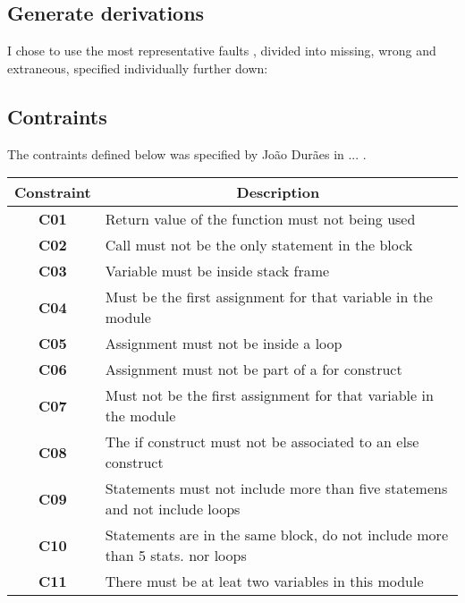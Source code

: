 \subsection{Generate derivations}

I chose to use the most representative faults \cite{duraes2006emulation}, divided into missing, wrong and extraneous, specified individually further down:

\subsection{Contraints}

The contraints defined below was specified by João Durães in ... .

\begin{table}[h]
\begin{tabular}{|c|l|}
\hline
\textbf{Constraint} & \multicolumn{1}{c|}{\textbf{Description}}                                     \\ \hline
\textbf{C01}       \label{C01}  & Return value of the function must not being used                              \\ \hline
\textbf{C02}       \label{C02}  & Call must not be the only statement in the block                              \\ \hline
\textbf{C03}       \label{C03}  & Variable must be inside stack frame                                           \\ \hline
\textbf{C04}       \label{C04}  & Must be the first assignment for that variable in the module                  \\ \hline
\textbf{C05}       \label{C05}  & Assignment must not be inside a loop                                          \\ \hline
\textbf{C06}       \label{C06}  & Assignment must not be part of a for construct                                \\ \hline
\textbf{C07}       \label{C07}  & Must not be the first assignment for that variable in the module              \\ \hline
\textbf{C08}       \label{C08}  & The if construct must not be associated to an else construct                  \\ \hline
\textbf{C09}       \label{C09}  & Statements must not include more than five statemens and not include loops    \\ \hline
\textbf{C10}       \label{C010} & Statements are in the same block, do not include more than 5 stats. nor loops \\ \hline
\textbf{C11}       \label{C011} & There must be at leat two variables in this module                            \\ \hline
\end{tabular}
\end{table}

